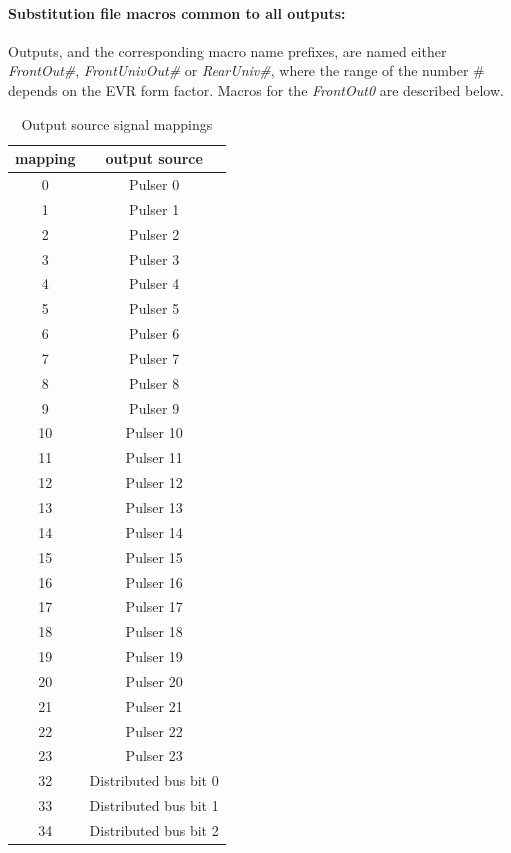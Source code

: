 \documentclass[12pt,a4paper]{article}
\begin{document}
\paragraph{Substitution file macros common to all outputs:} Outputs, and the corresponding macro name prefixes, are named either \emph{FrontOut\#},\emph{ FrontUnivOut\#} or \emph{RearUniv\#}, where the range of the number \# depends on the EVR form factor. Macros for the \emph{FrontOut0} are described below. 

\begin{table}[!hbt]
\caption{Output source signal mappings}
\label{tab:mappings}
\centering
	\begin{tabular}{|c|c|}
		\hline \textbf{mapping} & \textbf{output source} \\ \hline 
		\hline 0 & Pulser 0 \\ 
		\hline 1 & Pulser 1 \\ 
		\hline 2 & Pulser 2 \\ 
		\hline 3 & Pulser 3 \\ 
		\hline 4 & Pulser 4 \\ 
		\hline 5 & Pulser 5 \\ 
		\hline 6 & Pulser 6 \\ 
		\hline 7 & Pulser 7 \\ 
		\hline 8 & Pulser 8 \\ 
		\hline 9 & Pulser 9 \\ 
		\hline 10 & Pulser 10 \\ 
		\hline 11 & Pulser 11 \\ 
		\hline 12 & Pulser 12 \\ 
		\hline 13 & Pulser 13 \\ 
		\hline 14 & Pulser 14 \\ 
		\hline 15 & Pulser 15 \\ 
		\hline 16 & Pulser 16 \\ 
		\hline 17 & Pulser 17 \\ 
		\hline 18 & Pulser 18 \\ 
		\hline 19 & Pulser 19 \\ 
		\hline 20 & Pulser 20 \\ 
		\hline 21 & Pulser 21 \\
		\hline 22 & Pulser 22 \\
		\hline 23 & Pulser 23 \\
		\hline 32 & Distributed bus bit 0 \\ 
		\hline 33 & Distributed bus bit 1 \\ 
		\hline 34 & Distributed bus bit 2 \\ 

\end{tabular}
\end{table}
\end{document}
